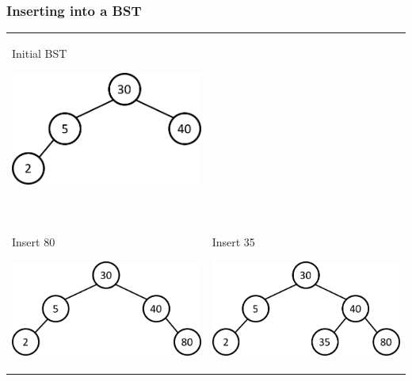 \documentclass[newPxFont,sthlmFooter,nooffset]{beamer}
\begin{document}
\begin{frame}[t]
  \frametitle{Inserting into a BST}
  \begin{tabular}{p{} p{}}
Initial BST

    \includegraphics[height=0.3\textheight]{./figures/fig16_bst_insert.png}
&   ~\\
~& ~\\
Insert 80

    \includegraphics[height=0.3\textheight]{./figures/fig16_bst_insert1.png}
&
Insert 35

    \includegraphics[height=0.3\textheight]{./figures/fig16_bst_insert2.png}
\\
  \end{tabular}
\end{frame}
\end{document}
